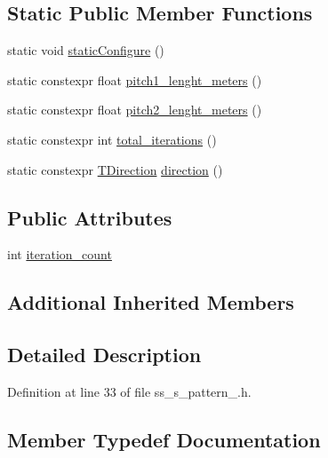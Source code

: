 \subsection*{Static Public Member Functions}
\begin{DoxyCompactItemize}
\item 
static void \hyperlink{structsm__dance__bot__3_1_1SS5_1_1SsSPattern1_a7e388010bca7db8e999d424f5b87d2c4}{static\+Configure} ()
\item 
static constexpr float \hyperlink{structsm__dance__bot__3_1_1SS5_1_1SsSPattern1_ae1ab8de1c53ef34e844e3b9812df69bb}{pitch1\+\_\+lenght\+\_\+meters} ()
\item 
static constexpr float \hyperlink{structsm__dance__bot__3_1_1SS5_1_1SsSPattern1_a1f789b55772fd7504d6a1eeeeb8d2633}{pitch2\+\_\+lenght\+\_\+meters} ()
\item 
static constexpr int \hyperlink{structsm__dance__bot__3_1_1SS5_1_1SsSPattern1_a8df8490a97d4c4704d1c583888d5be23}{total\+\_\+iterations} ()
\item 
static constexpr \hyperlink{namespacesm__dance__bot__3_1_1SS5_afb36760ee122ff90c189fc415cc8daa5}{T\+Direction} \hyperlink{structsm__dance__bot__3_1_1SS5_1_1SsSPattern1_adce5119ce940a1455ab8074e86c98c58}{direction} ()
\end{DoxyCompactItemize}
\subsection*{Public Attributes}
\begin{DoxyCompactItemize}
\item 
int \hyperlink{structsm__dance__bot__3_1_1SS5_1_1SsSPattern1_a4036a16738f35128aae6a1577496c0b5}{iteration\+\_\+count}
\end{DoxyCompactItemize}
\subsection*{Additional Inherited Members}


\subsection{Detailed Description}


Definition at line 33 of file ss\+\_\+s\+\_\+pattern\+\_.\+h.



\subsection{Member Typedef Documentation}

